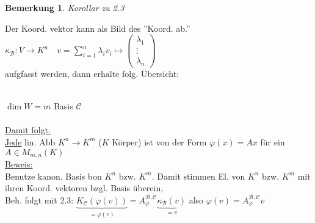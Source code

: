 \documentclass[a4paper,11pt]{article}
\newtheorem{bem}[definition]{Bemerkung}
\begin{document}
\begin{bem}
	Korollar zu 2.3
\end{bem}
Der Koord. vektor kann als Bild des ''Koord. ab.'' \\
$\kappa_\mathcal{B}\colon V\to K^n\quad v=\sum^n_{i=1}\lambda_iv_i\mapsto\begin{pmatrix}\lambda_1 \\ \vdots \\ \lambda_n\end{pmatrix}$ \\
aufgfasst werden, dann erhalte folg. Übersicht: \\
 \\
$\dim W=m$ Basis $\mathcal{C}$ \\ \\
\underline{Damit folgt.} \\
\underline{Jede} lin. Abb $K^n\to K^m$ ($K$ Körper) ist von der Form $\varphi(x)=Ax$ für ein $A\in M_{m,n}(K)$ \\
\underline{Beweis:} \\
Benutze kanon. Basis bon $K^n$ bzw. $K^m$. Damit stimmen El. von $K^n$ bzw. $K^m$ mit ihren Koord. vektoren bzgl. Basis überein, \\
Beh. folgt mit 2.3: $\underbrace{K_\mathcal{C}(\varphi(v))}_{=\varphi(v)}=A^{\mathcal{B},\mathcal{C}}_\varphi\underbrace{\kappa_\mathcal{B}(v)}_{=v}$ also $\varphi(v)=A^{\mathcal{B},\mathcal{C}}_\varphi v$
\end{document}
